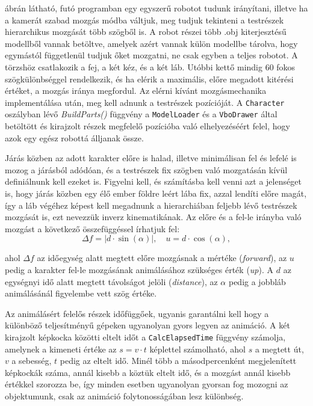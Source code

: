  ábrán látható, futó programban egy egyszerű robotot tudunk irányítani, illetve ha a kamerát szabad mozgás módba váltjuk, meg tudjuk tekinteni a testrészek hierarchikus mozgását több szögből is. A robot részei több .obj kiterjesztésű modellből vannak betöltve, amelyek azért vannak külön modellbe tárolva, hogy egymástól függetlenül tudjuk őket mozgatni, ne csak egyben a teljes robotot. A törzshöz csatlakozik a fej, a két kéz, és a két láb. Utóbbi kettő mindig 60 fokos szögkülönbséggel rendelkezik, és ha elérik a maximális, előre megadott kitérési értéket, a mozgás iránya megfordul. Az elérni kívánt mozgásmechanika implementálása után, meg kell adnunk a testrészek pozícióját. A \texttt{Character} oszályban lévő \textsl{BuildParts()} függvény a \texttt{ModelLoader} és a \texttt{VboDrawer} által betöltött és kirajzolt részek megfelelő pozícióba való elhelyezéséért felel, hogy azok egy egész robottá álljanak össze.

Járás közben az adott karakter előre is halad, illetve minimálisan fel és lefelé is mozog a járásból adódóan, és a testrészek fix szögben való mozgatásán kívül definiálnunk kell ezeket is. Figyelni kell, és számításba kell venni azt a jelenséget is, hogy járás közben egy élő ember  földre leért lába fix, azzal lendíti előre magát, így a láb végéhez képest kell megadnunk a hierarchiában feljebb lévő testrészek mozgását is, ezt nevezzük inverz kinematikának. Az előre és a fel-le irányba való mozgást a következő összefüggéssel írhatjuk fel:
$$
\Delta f = \left|
d \cdot \sin(\alpha)
\right|, \quad u = d \cdot \cos(\alpha),
$$

ahol $\Delta f$ az időegység alatt megtett előre mozgásnak a mértéke (\textit{forward}), az $u$ pedig a karakter fel-le mozgásának animálásához szükséges érték (\textit{up}). A $d$ az egységnyi idő alatt megtett távolságot jelöli (\textit{distance}), az $\alpha$ pedig a jobbláb animálásánál figyelembe vett szög értéke.

Az animálásért felelős részek időfüggőek, ugyanis garantálni kell hogy a különböző teljesítményű gépeken ugyanolyan gyors legyen az animáció. A két kirajzolt képkocka közötti eltelt időt a \texttt{CalcElapsedTime} függvény számolja, amelynek a kimeneti értéke az $s = v \cdot t$ képlettel számolható, ahol $s$ a megtett út, $v$ a sebesség, $t$ pedig az eltelt idő. Minél több a másodpercenként megjelenített képkockák száma, annál kisebb a köztük eltelt idő, és a mozgást annál kisebb értékkel szorozza be, így minden esetben ugyanolyan gyorsan fog mozogni az objektumunk, csak az animáció folytonosságában lesz különbség.

